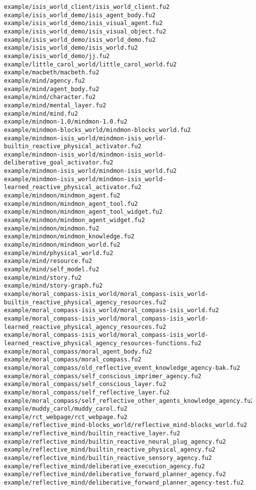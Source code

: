 \begin{lstlisting}
example/isis_world_client/isis_world_client.fu2
example/isis_world_demo/isis_agent_body.fu2
example/isis_world_demo/isis_visual_agent.fu2
example/isis_world_demo/isis_visual_object.fu2
example/isis_world_demo/isis_world_demo.fu2
example/isis_world_demo/isis_world.fu2
example/isis_world_demo/jj.fu2
example/little_carol_world/little_carol_world.fu2
example/macbeth/macbeth.fu2
example/mind/agency.fu2
example/mind/agent_body.fu2
example/mind/character.fu2
example/mind/mental_layer.fu2
example/mind/mind.fu2
example/mindmon-1.0/mindmon-1.0.fu2
example/mindmon-blocks_world/mindmon-blocks_world.fu2
example/mindmon-isis_world/mindmon-isis_world-builtin_reactive_physical_activator.fu2
example/mindmon-isis_world/mindmon-isis_world-deliberative_goal_activator.fu2
example/mindmon-isis_world/mindmon-isis_world.fu2
example/mindmon-isis_world/mindmon-isis_world-learned_reactive_physical_activator.fu2
example/mindmon/mindmon_agent.fu2
example/mindmon/mindmon_agent_tool.fu2
example/mindmon/mindmon_agent_tool_widget.fu2
example/mindmon/mindmon_agent_widget.fu2
example/mindmon/mindmon.fu2
example/mindmon/mindmon_knowledge.fu2
example/mindmon/mindmon_world.fu2
example/mind/physical_world.fu2
example/mind/resource.fu2
example/mind/self_model.fu2
example/mind/story.fu2
example/mind/story-graph.fu2
example/moral_compass-isis_world/moral_compass-isis_world-builtin_reactive_physical_agency_resources.fu2
example/moral_compass-isis_world/moral_compass-isis_world.fu2
example/moral_compass-isis_world/moral_compass-isis_world-learned_reactive_physical_agency_resources.fu2
example/moral_compass-isis_world/moral_compass-isis_world-learned_reactive_physical_agency_resources-functions.fu2
example/moral_compass/moral_agent_body.fu2
example/moral_compass/moral_compass.fu2
example/moral_compass/old_reflective_event_knowledge_agency-bak.fu2
example/moral_compass/self_conscious_imprimer_agency.fu2
example/moral_compass/self_conscious_layer.fu2
example/moral_compass/self_reflective_layer.fu2
example/moral_compass/self_reflective_other_agents_knowledge_agency.fu2
example/muddy_carol/muddy_carol.fu2
example/rct_webpage/rct_webpage.fu2
example/reflective_mind-blocks_world/reflective_mind-blocks_world.fu2
example/reflective_mind/builtin_reactive_layer.fu2
example/reflective_mind/builtin_reactive_neural_plug_agency.fu2
example/reflective_mind/builtin_reactive_physical_agency.fu2
example/reflective_mind/builtin_reactive_sensory_agency.fu2
example/reflective_mind/deliberative_execution_agency.fu2
example/reflective_mind/deliberative_forward_planner_agency.fu2
example/reflective_mind/deliberative_forward_planner_agency-test.fu2

\end{lstlisting}
